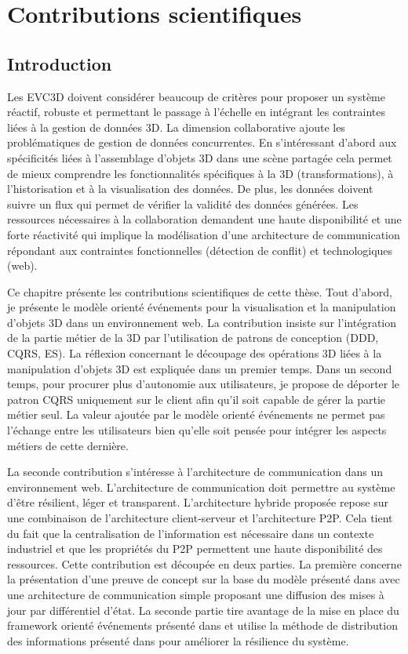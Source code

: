 \chapter{Contributions scientifiques}
\chaptertable
\section{Introduction}
Les \gls{EVC3D} doivent considérer beaucoup de critères pour 
proposer un système réactif, robuste et permettant le passage à l'échelle en 
intégrant les contraintes liées à la gestion de données 3D. La dimension 
collaborative ajoute les problématiques de gestion de données concurrentes.
En s'intéressant d'abord aux spécificités liées à 
l'assemblage d'objets 3D dans une scène partagée cela permet de 
mieux comprendre les fonctionnalités spécifiques à la 3D (transformations), 
à l'historisation et à la visualisation des données. De plus, les données 
doivent suivre un flux qui permet de vérifier la validité des données générées.
Les ressources nécessaires à la collaboration demandent une haute disponibilité 
et une forte réactivité qui implique la modélisation d'une architecture 
de communication répondant aux contraintes fonctionnelles (détection de conflit) 
et technologiques (web).

Ce chapitre présente les contributions scientifiques de cette thèse.
Tout d'abord, je présente le modèle orienté événements pour la 
visualisation et la manipulation d'objets 3D dans un environnement web. La 
contribution insiste sur l'intégration de la partie métier de la 3D par l'utilisation de 
patrons de conception (\gls{DDD}, \gls{CQRS}, \gls{ES}). La réflexion concernant 
le découpage des opérations 3D liées à la manipulation d'objets 3D est expliquée 
dans un premier temps. Dans un second temps, pour procurer plus d'autonomie 
aux utilisateurs, je propose de déporter le patron \gls{CQRS} uniquement sur le 
client afin qu'il soit capable de gérer la partie métier seul. La valeur ajoutée par le 
modèle orienté événements ne permet pas l'échange entre les utilisateurs bien 
qu'elle soit pensée pour intégrer les aspects métiers de cette dernière. 

La seconde contribution s'intéresse à l'architecture de 
communication dans un environnement web. L'architecture de communication doit 
permettre au système d'être résilient, léger et transparent. 
L'architecture hybride proposée repose sur une combinaison de l'architecture 
client-serveur et l'architecture \gls{P2P}. 
Cela tient du fait que la centralisation de l'information est nécessaire dans un 
contexte industriel et que les propriétés du \gls{P2P} permettent une haute disponibilité 
des ressources. Cette contribution est découpée en deux parties. La première 
concerne la présentation d'une preuve de concept sur la base du modèle présenté 
dans \cite{Desprat2015a} avec une architecture de communication simple 
proposant une diffusion des mises à jour par différentiel d'état. La seconde partie 
tire avantage de la mise en place du \gls{framework} orienté événements présenté 
dans 
\cite{Desprat2016} et utilise la méthode de distribution des informations présenté 
dans \cite{Desprat2017} pour améliorer la résilience du système. 

